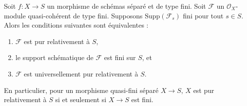 \begin{lemma}
\label{lemma-quasi-finite-pure}
Soit $f : X \to S$ un morphisme de schémas séparé et de type fini.
Soit $\mathcal{F}$ un $\mathcal{O}_X$-module quasi-cohérent de type fini.
Supposons $\text{Supp}(\mathcal{F}_s)$ fini pour tout $s \in S$.
Alors les conditions suivantes sont équivalentes :
\begin{enumerate}
\item $\mathcal{F}$ est pur relativement à $S$,
\item le support schématique de $\mathcal{F}$ est fini sur $S$, et
\item $\mathcal{F}$ est universellement pur relativement à $S$.
\end{enumerate}
En particulier, pour un morphisme quasi-fini séparé $X \to S$,
$X$ est pur relativement à $S$ si et seulement si $X \to S$ est fini.
\end{lemma}


